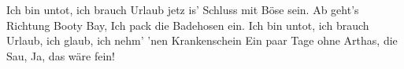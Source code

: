    \beginchorus
        Ich bin untot, ich brauch Urlaub
        jetz is' Schluss mit B\"{o}se sein.
        Ab geht's Richtung Booty Bay,
        Ich pack die Badehosen ein.
        Ich bin untot, ich brauch Urlaub,
        ich glaub, ich nehm' 'nen Krankenschein
        Ein paar Tage ohne Arthas, die Sau,
        Ja, das w\"{a}re fein!
    \endchorus
\endsong

